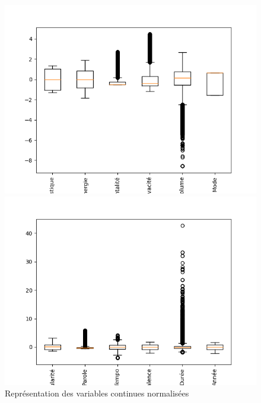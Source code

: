\documentclass[a4paper, 12pt]{report}
\begin{document}
\begin{figure}[htbp]
    \begin{minipage}[t]{0.49\textwidth}
        \centering
        \includegraphics[width=\textwidth]{Images/Boîte à moustache des variables 1 à 6.png}
    \end{minipage}\hfill
    \begin{minipage}[t]{0.49\textwidth}
        \centering
        \includegraphics[width=\textwidth]{Images/Boîte à moustache des variables 7 à 12.png}
    \end{minipage}
    
    \caption{Représentation des variables continues normalisées}
    \label{fig:enter-label}
\end{figure}
\end{document}
